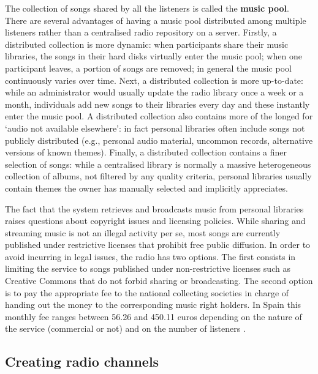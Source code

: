 The collection of songs shared by all the listeners is called the \textbf{music pool}.
There are several advantages of having a music pool distributed among multiple listeners rather than a centralised radio repository on a server.
Firstly, a distributed collection is more dynamic: when participants share their music libraries, the songs in their hard disks virtually enter the music pool; when one participant leaves, a portion of songs are removed; in general the music pool continuously varies over time.
Next, a distributed collection is more up-to-date: while an administrator would usually update the radio library once a week or a month, individuals add new songs to their libraries every day and these instantly enter the music pool.
A distributed collection also contains more of the longed for `audio not available elsewhere': in fact personal libraries often include songs not publicly distributed (e.g., personal audio material, uncommon records, alternative versions of known themes).
Finally, a distributed collection  contains a finer selection of songs: while a centralised library is normally a massive heterogeneous collection of albums, not filtered by any quality criteria, personal libraries usually contain themes the owner has manually selected and implicitly appreciates.

The fact that the system retrieves and broadcasts music from personal libraries raises questions about copyright issues and licensing policies.
While sharing and streaming music is not an illegal activity per se, most songs are currently published under restrictive licenses that prohibit free public diffusion.
In order to avoid incurring in legal issues, the radio has two options.
The first consists in limiting the service to songs published under non-restrictive licenses such as Creative Commons \cite{CreativeCommons04} that do not forbid sharing or broadcasting.
The second option is to pay the appropriate fee to the national collecting societies in charge of handing out the money to the corresponding music right holders. 
In Spain this monthly fee ranges between 56.26 and 450.11 euros depending on the nature of the service (commercial or not) and on the number of listeners \cite{Sgae06}. %

\subsection{Creating radio channels}

